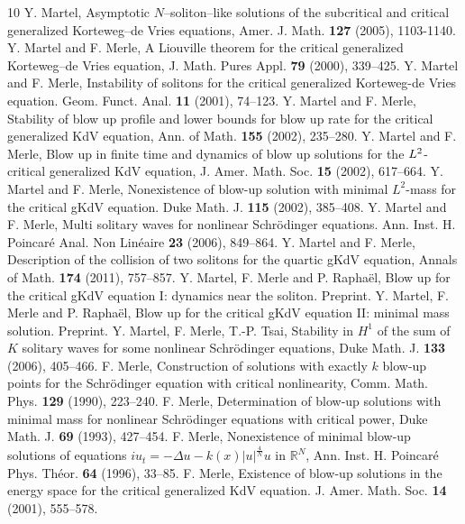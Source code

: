 \documentclass[11pt,a4paper,reqno]{amsart}
\theoremstyle{remark}
\numberwithin{equation}{section}
\def\RR{\mathbb{R}}
\def\RR{\mathbb{R}}
\begin{document}
\begin{thebibliography}{10}
  Y. Martel, Asymptotic $N$--soliton--like solutions of the subcritical and critical generalized Korteweg--de Vries equations, Amer. J. Math.  \textbf{127} (2005), 1103-1140.
 Y. Martel and F. Merle, 
A Liouville theorem for the critical generalized Korteweg--de Vries equation, 
J. Math. Pures Appl. \textbf{79} (2000), 339--425.
 Y. Martel and F. Merle, Instability of solitons for the critical generalized Korteweg-de Vries equation.  Geom. Funct. Anal.  \textbf{11}  (2001),   74--123.
 Y. Martel and F. Merle,
Stability of blow up profile and lower bounds for blow up rate for the critical generalized KdV equation,
Ann. of Math. \textbf{155} (2002), 235--280.
Y. Martel and F. Merle, Blow up in finite time and dynamics of blow up solutions for the $L\sp 2$-critical generalized KdV equation,  J. Amer. Math. Soc.  \textbf{15}  (2002),   617--664.
 Y. Martel and F. Merle,   Nonexistence of blow-up solution with minimal $L^2$-mass for the critical gKdV equation. Duke Math. J. \textbf{115} (2002),  385--408.
Y. Martel and F.  Merle, Multi solitary waves for nonlinear Schr\"odinger equations. Ann. Inst. H. Poincar\'e Anal. Non Lin\'eaire \textbf{23} (2006),   849--864.
 Y. Martel and F. Merle, Description of the collision of two solitons for the quartic gKdV equation, Annals of Math. \textbf{174} (2011), 757--857.
 Y. Martel, F. Merle and P. Rapha\"el, 
Blow up for the critical gKdV equation I: dynamics near the soliton. Preprint.
 Y. Martel, F. Merle and P. Rapha\"el, 
Blow up for the critical gKdV equation II: minimal mass solution. Preprint.
 Y. Martel, F. Merle, T.-P. Tsai, Stability in $H^1$ of the sum of $K$ solitary waves for some nonlinear Schr\"odinger equations, Duke Math. J. \textbf{133} (2006),    405--466.
F. Merle,  Construction of solutions with exactly $k$ blow-up points for the Schr\"odinger equation with critical nonlinearity, Comm. Math. Phys. \textbf{129} (1990),   223--240.
 F. Merle, Determination of blow-up solutions with minimal mass for nonlinear Schr\"odinger equations with critical power, Duke Math. J. \textbf{69} (1993),  427--454.
 F. Merle, Nonexistence of minimal blow-up solutions of equations $iu_t = -\Delta u -k(x)|u|^{\frac 4N}u$ in $\RR^N$, Ann. Inst. H. Poincar\'e Phys. Th\'eor. \textbf{64} (1996),   33--85.
 F. Merle, Existence of blow-up solutions in the energy space for the critical generalized KdV equation.  J. Amer. Math. Soc.  \textbf{14}  (2001),  555--578.

\end{thebibliography}
\end{document}
